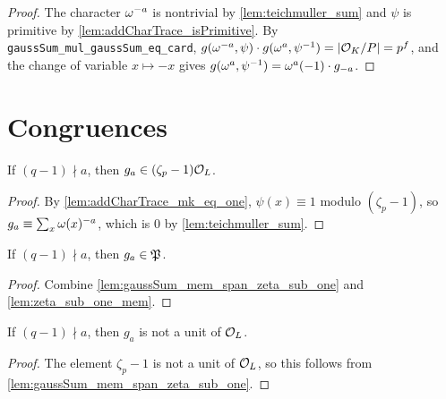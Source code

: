\begin{proof}
  \leanok
  The character $\omega^{-a}$ is nontrivial by \ref{lem:teichmuller_sum} and $\psi$ is primitive
  by \ref{lem:addCharTrace_isPrimitive}. By \texttt{gaussSum\_mul\_gaussSum\_eq\_card},
  $g(\omega^{-a}, \psi) \cdot g(\omega^{a}, \psi^{-1}) = |\mathcal{O}_K/P| = p^f$, and the change of
  variable $x \mapsto -x$ gives $g(\omega^{a}, \psi^{-1}) = \omega^{a}(-1) \cdot g_{-a}$.
\end{proof}

\section{Congruences}

\begin{lemma}
  \label{lem:gaussSum_mem_span_zeta_sub_one}
  \leanok
  If $(q-1) \nmid a$, then $g_a \in (\zeta_p - 1)\mathcal{O}_L$.
\end{lemma}

\begin{proof}
  \leanok
  By \ref{lem:addCharTrace_mk_eq_one}, $\psi(x) \equiv 1$ modulo $(\zeta_p - 1)$, so
  $g_a \equiv \sum_x \omega(x)^{-a}$, which is $0$ by \ref{lem:teichmuller_sum}.
\end{proof}

\begin{lemma}
  \label{lem:GaussSum_mem}
  \leanok
  If $(q-1) \nmid a$, then $g_a \in \mathfrak{P}$.
\end{lemma}

\begin{proof}
  \leanok
  Combine \ref{lem:gaussSum_mem_span_zeta_sub_one} and \ref{lem:zeta_sub_one_mem}.
\end{proof}

\begin{lemma}
  \label{lem:not_isUnit_gaussSum}
  \leanok
  If $(q-1) \nmid a$, then $g_a$ is not a unit of $\mathcal{O}_L$.
\end{lemma}

\begin{proof}
  \leanok
  The element $\zeta_p - 1$ is not a unit of $\mathcal{O}_L$, so this follows from
  \ref{lem:gaussSum_mem_span_zeta_sub_one}.
\end{proof}

